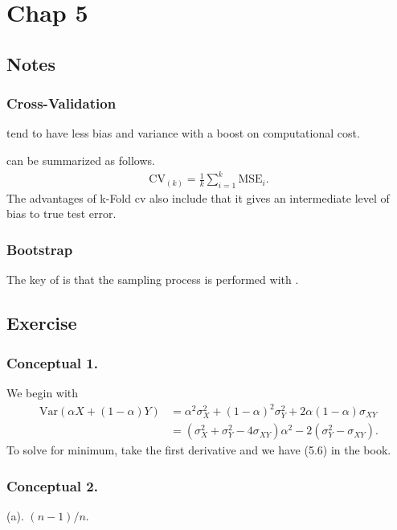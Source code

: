 \section{Chap 5}
\subsection{Notes}
\subsubsection{Cross-Validation}
 tend to have less bias and variance with a boost on computational cost. 

 can be summarized as follows.
\begin{align*}
\text{CV}_{(k)} = \frac{1}{k}\sum_{i=1}^{k}\text{MSE}_i.
\end{align*}
The advantages of k-Fold cv also include that it gives an intermediate level of bias to true test error.
\subsubsection{Bootstrap} 
The key of  is that the sampling process is performed with .
\subsection{Exercise}
\subsubsection{Conceptual 1.}
We begin with
\begin{align*}
\text{Var}(\alpha X + (1-\alpha)Y) & = \alpha^2 \sigma_X^2 + (1-\alpha)^2\sigma_Y^2  + 2\alpha(1-\alpha)\sigma_{XY} \\
& = (\sigma_X^2 + \sigma_Y^2 - 4\sigma_{XY})\alpha^2  - 2(\sigma_Y^2 - \sigma_{XY}).
\end{align*}
To solve for minimum, take the first derivative and we have (5.6) in the book.
\subsubsection{Conceptual 2.}
(a). $(n-1)/n$.

